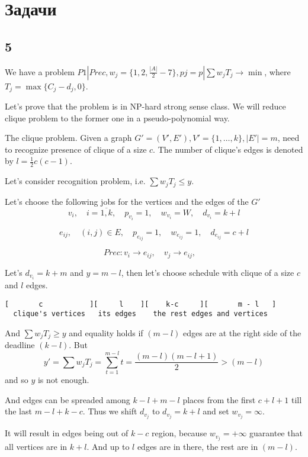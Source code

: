 \documentclass{amsart}
\begin{document}
\section{Задачи}

\subsection{5}

We have a problem
$P1 | Prec, w_j= \{ 1,2,\frac{|A|}{2}-7 \}, pj=p | \sum w_j T_j \to \min$,
where $T_j = \max \{C_j - d_j, 0\}$.

Let's prove that the problem is in NP-hard strong sense class.
We will reduce clique problem to the former one in a
pseudo-polynomial way.

The clique problem. Given a graph $G'=(V',E'), V'=\{1,\dots,k\}, |E'|=m$,
need to recognize presence of clique of a size $c$.
The number of clique's edges is denoted by
$l = \frac{1}{2}c(c-1)$.

Let's consider recognition problem, i.e. $\sum w_j T_j \leqslant y$.

Let's choose the following jobs for the vertices and the edges of the $G'$
\[
  v_i, \quad i=\overline{1,k}, \quad p_{v_i} = 1, \quad
  w_{v_i} = W, \quad d_{v_i} = k + l
\]

\[
  e_{ij}, \quad (i,j) \in E, \quad p_{e_{ij}} = 1, \quad
  w_{e_{ij}} = 1, \quad d_{e_{ij}} = c + l
\]

\[
  Prec: v_i \to e_{ij}, \quad v_j \to e_{ij}, \quad
\]

Let's $d_{v_i} = k + m$ and $y = m - l$, then let's
choose schedule with clique of a size $c$ and $l$ edges.

\begin{verbatim}
[       c           ][     l    ][    k-c     ][       m - l   ]
  clique's vertices   its edges    the rest edges and vertices
\end{verbatim}

And $\sum w_jT_j \geqslant y$ and equality holds if $(m-l)$
edges are at the right side of the deadline $(k-l)$.
But
\[
  y' = \sum w_jT_j = \sum_{t=1}^{m-l} t = \frac{(m-l)(m-l+1)}{2} > (m-l)
\]
and so $y$ is not enough.

And edges can be spreaded among $k - l + m - l$ places from the first
$c + l + 1$ till the last $m - l + k - c$. Thus we shift
$d_{v_j}$ to $d_{v_j} = k + l$ and set $w_{v_j}=\infty$.

It will result in edges being out of $k - c$ region,
because $w_{v_j}=+\infty$ guarantee that all vertices are in $k+l$.
And up to $l$ edges are in there, the rest are in $(m-l)$.
\end{document}
